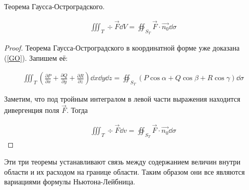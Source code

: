 \begin{theorem}
  Теорема Гаусса-Остроградского.

  \begin{align*}
    \iiint_{T} \div \vec{F} \dd V
    =
    \oiint_{S_{T}} \vec{F} \cdot \vec{n_{0}} \dd \sigma
  \end{align*}
\end{theorem}
\begin{proof}
  Теорема Гаусса-Остроградского в координатной форме уже доказана (\ref{GO}).
  Запишем её:

  \begin{align*}
    \iiint_{T} \left(
      \frac{\partial P}{\partial x} +
      \frac{\partial Q}{\partial y} +
      \frac{\partial R}{\partial z}
    \right) \dd x \dd y \dd z
    =
    \oiint_{S_{T}} \left(
      P \cos \alpha +
      Q \cos \beta +
      R \cos \gamma
    \right) \dd \sigma
  \end{align*}

  Заметим, что под тройным интегралом в левой части выражения находится
  дивергенция поля \(\vec{F}\). Тогда

  \begin{align*}
    \iiint_{T} \div \vec{F} \dd v
    =
    \oiint_{S_{T}} \vec{F} \cdot \vec{n_{0}} \dd \sigma
  \end{align*}
\end{proof}

\begin{remark}
  Эти три теоремы устанавливают связь между содержанием величин внутри области и
  их расходом на границе области. Таким образом они все являются вариациями
  формулы Ньютона-Лейбница.
\end{remark}
